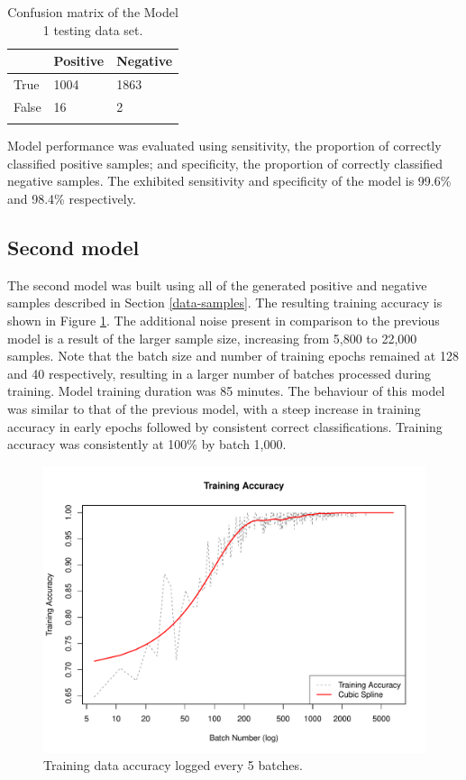 \begin{table}[ht]
	\centering
	\begin{tabular}{@{}lll@{}}
	\toprule[1.5pt]
	& Positive & Negative\\
	\midrule
	True & 1004 & 1863\\
	False & 16 & 2\\
	\bottomrule[1.5pt]\\
	\end{tabular}
	\caption{\small{Confusion matrix of the Model 1 testing data set.}}
	\label{results-confmat4-tab}
\end{table}

Model performance was evaluated using sensitivity, the proportion of correctly classified positive samples; and specificity, the proportion of correctly classified negative samples. The exhibited sensitivity and specificity of the model is 99.6\% and 98.4\% respectively.

\subsection*{Second model}

The second model was built using all of the generated positive and negative samples described in Section \ref{data-samples}. The resulting training accuracy is shown in Figure \ref{results-train-acc5-fig}. The additional noise present in comparison to the previous model is a result of the larger sample size, increasing from 5,800 to 22,000 samples. Note that the batch size and number of training epochs remained at 128 and 40 respectively, resulting in a larger number of batches processed during training. Model training duration was 85 minutes. The behaviour of this model was similar to that of the previous model, with a steep increase in training accuracy in early epochs followed by consistent correct classifications. Training accuracy was consistently at 100\% by batch 1,000.

\begin{figure}[ht]
	\centering
	\includegraphics[width=\textwidth]{Images/7_train_acc5.pdf}
	\caption{\small{Training data accuracy logged every 5 batches.}}
	\label{results-train-acc5-fig}
\end{figure}


